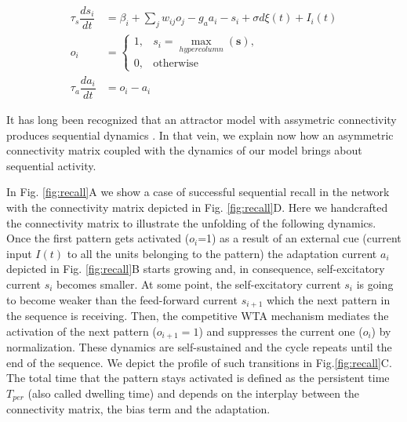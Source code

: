 \documentclass[10pt,a4paper]{article}
\begin{document}
\begin{align}
\tau_s \dfrac{ds_i}{dt} &= \beta_i + \sum_{j} w_{ij} o_j  - g_a a_i - s_i  + \sigma d\xi(t) + I_i(t) \label{eq:current} \\ o_i &=   \begin{cases}
       1,&  s_i = \underset{hypercolumn}{\max}(\mathbf{s}),\\
       0 ,& \text{otherwise}
    \end{cases} \label{eq:non-linearity} \\
\tau_a \dfrac{da_i}{dt} &= o_i - a_i \label{eq:adaptation} 
\end{align}


It has long been recognized that an attractor model with assymetric connectivity produces sequential dynamics \cite{amit1992modeling}. In that vein, we explain now how an asymmetric connectivity matrix coupled with the dynamics of our model brings about sequential activity. 
 
In Fig. \ref{fig:recall}A we show a case of successful sequential recall in the network with the connectivity matrix depicted in  Fig. \ref{fig:recall}D. Here we handcrafted the connectivity matrix to illustrate the unfolding of the following dynamics. Once the first pattern gets activated ($o_i$=1) as a result of an external cue (current input $I(t)$ to all the units belonging to the pattern) the adaptation current $a_i$ depicted in Fig. \ref{fig:recall}B starts growing and, in consequence, self-excitatory current $s_i$ becomes smaller. At some point, the self-excitatory current $s_i$ is going to become weaker than the feed-forward current $s_{i + 1}$ which the next pattern in the sequence is receiving. Then, the competitive WTA mechanism mediates the activation of the next pattern ($o_{i + 1} = 1$) and suppresses the current one ($o_{i}$) by normalization. These dynamics are self-sustained and the cycle repeats until the end of the sequence. We depict the profile of such transitions in Fig.\ref{fig:recall}C. The total time that the pattern stays activated is defined as the persistent time $T_{per}$ (also called dwelling time) and depends on the interplay between the connectivity matrix, the bias term and the adaptation.
\end{document}
